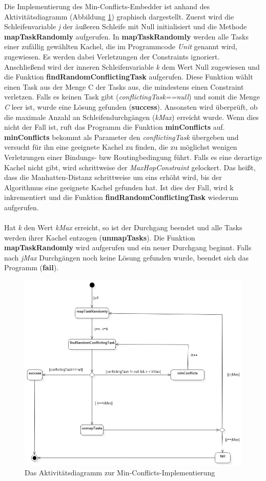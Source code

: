 Die Implementierung des Min-Conflicts-Embedder ist anhand des Aktivitätsdiagramm (Abbildung \ref{fig:minConflictsAkti}) graphisch dargestellt. Zuerst wird die Schleifenvariable \textit{j} der äußeren Schleife mit Null initialisiert und die Methode \textbf{mapTaskRandomly} aufgerufen. In \textbf{mapTaskRandomly} werden alle Tasks einer zufällig gewählten Kachel, die im Programmcode \textit{Unit} genannt wird, zugewiesen. Es werden dabei Verletzungen der Constraints ignoriert. Anschließend wird der inneren Schleifenvariable \textit{k} dem Wert Null zugewiesen und die Funktion \textbf{findRandomConflictingTask} aufgerufen. Diese Funktion wählt einen Task aus der Menge C der Tasks aus, die mindestens einen Constraint verletzen. Falls es keinen Task gibt (\textit{conflictingTask==null}) und somit die Menge \textit{C} leer ist, wurde eine Lösung gefunden (\textbf{success}). Ansonsten wird überprüft, ob die maximale Anzahl an Schleifendurchgängen (\textit{kMax}) erreicht wurde. Wenn dies nicht der Fall ist, ruft das Programm die Funktion \textbf{minConflicts} auf. \textbf{minConflicts} bekommt als Parameter den \textit{conflictingTask} übergeben und versucht für ihn eine geeignete Kachel zu finden, die zu möglichst wenigen Verletzungen einer Bindungs- bzw Routingbedingung führt. Falls es eine derartige Kachel nicht gibt, wird schrittweise der \textit{MaxHopConstraint} gelockert. Das heißt, dass die Manhatten-Distanz schrittweise um eins erhöht wird, bis der Algorithmus eine geeignete Kachel gefunden hat. Ist dies der Fall, wird k inkrementiert und die Funktion \textbf{findRandomConflictingTask} wiederum aufgerufen. \\
\\
Hat \textit{k} den Wert \textit{kMax} erreicht, so ist der Durchgang beendet und alle Tasks werden ihrer Kachel entzogen (\textbf{unmapTasks}). Die Funktion \textbf{mapTaskRandomly} wird aufgerufen und ein neuer Durchgang beginnt. Falls nach \textit{jMax} Durchgängen noch keine Lösung gefunden wurde, beendet sich das Programm (\textbf{fail}).

\begin{figure}[H]\centering
  \includegraphics[width = 150mm]{bilder/minAkti.jpg}
  \caption{Das Aktivitätsdiagramm zur Min-Conflicts-Implementierung}\label{fig:minConflictsAkti}
\end{figure}